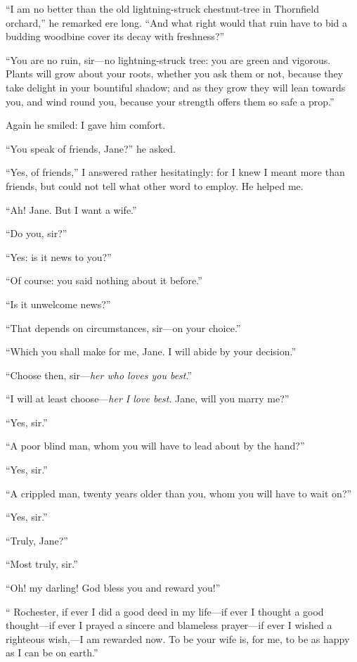 \enquote{I am no better than the old lightning-struck chestnut-tree in
Thornfield orchard,} he remarked ere long. \enquote{And what right
would that ruin have to bid a budding woodbine cover its decay with
freshness?}

\enquote{You are no ruin, sir---no lightning-struck tree: you are green
and vigorous. Plants will grow about your roots, whether you ask them
or not, because they take delight in your bountiful shadow; and as they
grow they will lean towards you, and wind round you, because your
strength offers them so safe a prop.}

Again he smiled: I gave him comfort.

\enquote{You speak of friends, Jane?} he asked.

\enquote{Yes, of friends,} I answered rather hesitatingly: for I knew I
meant more than friends, but could not tell what other word to employ. 
He helped me.

\enquote{Ah! Jane. But I want a wife.}

\enquote{Do you, sir?}

\enquote{Yes: is it news to you?}

\enquote{Of course: you said nothing about it before.}

\enquote{Is it unwelcome news?}

\enquote{That depends on circumstances, sir---on your choice.}

\enquote{Which you shall make for me, Jane. I will abide by your
decision.}

\enquote{Choose then, sir---\emph{her who loves you best}.}

\enquote{I will at least choose---\emph{her I love best}. Jane, will you marry
me?}

\enquote{Yes, sir.}

\enquote{A poor blind man, whom you will have to lead about by the
hand?}

\enquote{Yes, sir.}

\enquote{A crippled man, twenty years older than you, whom you will have
to wait on?}

\enquote{Yes, sir.}

\enquote{Truly, Jane?}

\enquote{Most truly, sir.}

\enquote{Oh! my darling! God bless you and reward you!}

\enquote{\Mr{} Rochester, if ever I did a good deed in my life---if ever I
thought a good thought---if ever I prayed a sincere and blameless
prayer---if ever I wished a righteous wish,---I am rewarded now. To be
your wife is, for me, to be as happy as I can be on earth.}

